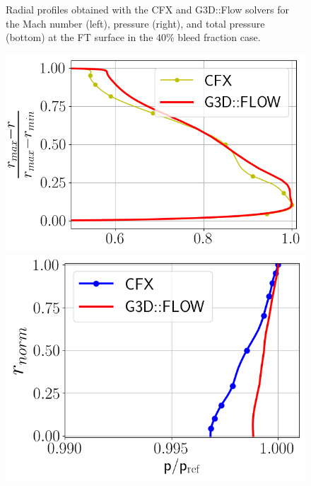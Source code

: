 \begin{figure}[h!]
\begin{minipage}{0.48\columnwidth}
  \end{minipage}
  \caption{Radial profiles obtained with the CFX and G3D::Flow solvers for the Mach number (left), pressure (right), and total pressure (bottom) at the FT surface in the $40\%$ bleed fraction case.} \label{fig:FT40}
\end{figure}

\begin{figure}[h!]
  \centering
  \begin{minipage}{0.48\columnwidth}
  \includegraphics[width=1.\textwidth]{Figures/MaMave_NRT.png}
  \end{minipage}
  \begin{minipage}{0.48\columnwidth}
  \includegraphics[width=1.\textwidth]{Figures/PAave_NRT.png}

\end{minipage}
\end{figure}
